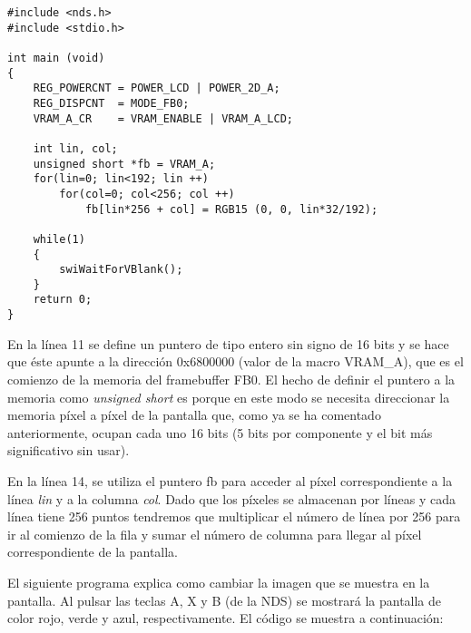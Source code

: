 \begin{lstlisting}	
#include <nds.h>
#include <stdio.h>

int main (void)
{
	REG_POWERCNT = POWER_LCD | POWER_2D_A;
	REG_DISPCNT  = MODE_FB0;
	VRAM_A_CR    = VRAM_ENABLE | VRAM_A_LCD;
		
	int lin, col;
	unsigned short *fb = VRAM_A;
	for(lin=0; lin<192; lin ++)
		for(col=0; col<256; col ++)
			fb[lin*256 + col] = RGB15 (0, 0, lin*32/192);
		
	while(1)
	{
		swiWaitForVBlank();
	}
	return 0;
}	
\end{lstlisting}
	
En la línea 11 se define un puntero de tipo entero sin signo de 16 bits y se hace que éste apunte a la dirección 0x6800000 (valor de la macro VRAM\_A), que es el comienzo de la memoria del framebuffer FB0. El hecho de definir el puntero a la memoria como \textit{unsigned short} es porque en este modo se necesita direccionar la memoria píxel a píxel de la pantalla que, como ya se ha comentado anteriormente, ocupan cada uno 16 bits (5 bits por componente y el bit más significativo sin usar).

En la línea 14, se utiliza el puntero fb para acceder al píxel correspondiente a la línea \textit{lin} y a la columna \textit{col}. Dado que los píxeles se almacenan por líneas y cada línea tiene 256 puntos tendremos que multiplicar el número de línea por 256 para ir al comienzo de la fila y sumar el número de columna para llegar al píxel correspondiente de la pantalla. 

El siguiente programa explica como cambiar la imagen que se muestra en la pantalla. Al pulsar las teclas A, X y B (de la NDS) se mostrará la pantalla de color rojo, verde y azul, respectivamente. El código se muestra a continuación:

